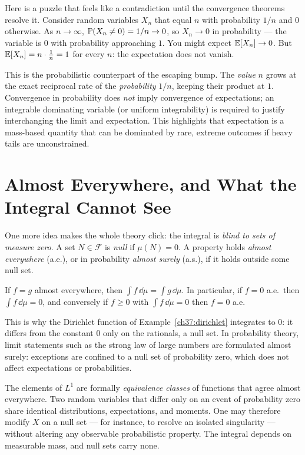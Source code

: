 \begin{paradoxbox}
Here is a puzzle that feels like a contradiction until the convergence theorems
resolve it. Consider random variables $X_n$ that equal $n$ with probability
$1/n$ and $0$ otherwise. As $n\to\infty$, $\P(X_n\ne 0)=1/n\to 0$, so $X_n\to 0$
in probability --- the variable is $0$ with probability approaching $1$. You might
expect $\E[X_n]\to 0$. But $\E[X_n]=n\cdot\frac1n = 1$ for every $n$: the
expectation does not vanish.

This is the probabilistic counterpart of the escaping bump. The
\emph{value} $n$ grows at the exact reciprocal rate of the \emph{probability}
$1/n$, keeping their product at $1$. Convergence in probability does \emph{not}
imply convergence of expectations; an integrable dominating variable (or uniform
integrability) is required to justify interchanging the limit and expectation.
This highlights that expectation is a mass-based quantity that can be dominated
by rare, extreme outcomes if heavy tails are unconstrained.
\end{paradoxbox}

\section{Almost Everywhere, and What the Integral Cannot See}
\label{ch37:ae}

One more idea makes the whole theory click: the integral is \emph{blind to sets
of measure zero}. A set $N\in\mathcal F$ is \emph{null} if $\mu(N)=0$. A
property holds \emph{almost everywhere} (a.e.), or in probability \emph{almost
surely} (a.s.), if it holds outside some null set.

\begin{proposition}
\label{ch37:prop-ae}
If $f=g$ almost everywhere, then $\int f\,\dd\mu = \int g\,\dd\mu$. In
particular, if $f=0$ a.e.\ then $\int f\,\dd\mu = 0$, and conversely if $f\ge 0$
with $\int f\,\dd\mu = 0$ then $f=0$ a.e.
\end{proposition}

This is why the Dirichlet function of Example~\ref{ch37:dirichlet} integrates to
$0$: it differs from the constant $0$ only on the rationals, a null set.
In probability theory, limit statements such as the strong law of large numbers
are formulated almost surely: exceptions are confined to a null set of probability zero,
which does not affect expectations or probabilities.

\begin{happeningbox}
The elements of $L^1$ are formally \emph{equivalence classes} of functions that agree
almost everywhere. Two random variables that differ only on an event of probability
zero share identical distributions, expectations, and moments. One may therefore
modify $X$ on a null set --- for instance, to resolve an isolated singularity --- without
altering any observable probabilistic property. The integral depends on measurable
mass, and null sets carry none.
\end{happeningbox}

